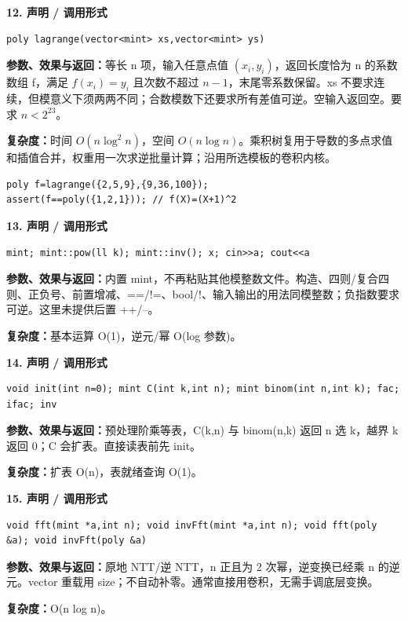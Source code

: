\documentclass[UTF8,a4paper,10pt]{ctexart}
\begin{document}
\noindent\begin{minipage}{\textwidth}
\textbf{12. 声明 / 调用形式}
\begin{lstlisting}
poly lagrange(vector<mint> xs,vector<mint> ys)
\end{lstlisting}
\textbf{参数、效果与返回：}等长 n 项，输入任意点值 $(x_i,y_i)$，返回长度恰为 n 的系数数组 f，满足 $f(x_i)=y_i$ 且次数不超过 $n-1$，末尾零系数保留。xs 不要求连续，但模意义下须两两不同；合数模数下还要求所有差值可逆。空输入返回空。要求 $n<2^{23}$。

\textbf{复杂度：}时间 $O(n\log^2 n)$，空间 $O(n\log n)$。乘积树复用于导数的多点求值和插值合并，权重用一次求逆批量计算；沿用所选模板的卷积内核。

\begin{lstlisting}
poly f=lagrange({2,5,9},{9,36,100});
assert(f==poly({1,2,1})); // f(X)=(X+1)^2
\end{lstlisting}

\end{minipage}\par\vspace{0.4em}
\noindent\begin{minipage}{\textwidth}
\textbf{13. 声明 / 调用形式}
\begin{lstlisting}
mint; mint::pow(ll k); mint::inv(); x; cin>>a; cout<<a
\end{lstlisting}
\textbf{参数、效果与返回：}内置 mint，不再粘贴其他模整数文件。构造、四则/复合四则、正负号、前置增减、==/!=、bool/!、输入输出的用法同模整数；负指数要求可逆。这里未提供后置 ++/--。

\textbf{复杂度：}基本运算 O(1)，逆元/幂 O(log 参数)。

\end{minipage}\par\vspace{0.4em}
\noindent\begin{minipage}{\textwidth}
\textbf{14. 声明 / 调用形式}
\begin{lstlisting}
void init(int n=0); mint C(int k,int n); mint binom(int n,int k); fac; ifac; inv
\end{lstlisting}
\textbf{参数、效果与返回：}预处理阶乘等表，C(k,n) 与 binom(n,k) 返回 n 选 k，越界 k 返回 0；C 会扩表。直接读表前先 init。

\textbf{复杂度：}扩表 O(n)，表就绪查询 O(1)。

\end{minipage}\par\vspace{0.4em}
\noindent\begin{minipage}{\textwidth}
\textbf{15. 声明 / 调用形式}
\begin{lstlisting}
void fft(mint *a,int n); void invFft(mint *a,int n); void fft(poly &a); void invFft(poly &a)
\end{lstlisting}
\textbf{参数、效果与返回：}原地 NTT/逆 NTT，n 正且为 2 次幂，逆变换已经乘 n 的逆元。vector 重载用 size；不自动补零。通常直接用卷积，无需手调底层变换。

\textbf{复杂度：}O(n log n)。

\end{minipage}\par\vspace{0.4em}
\end{document}
